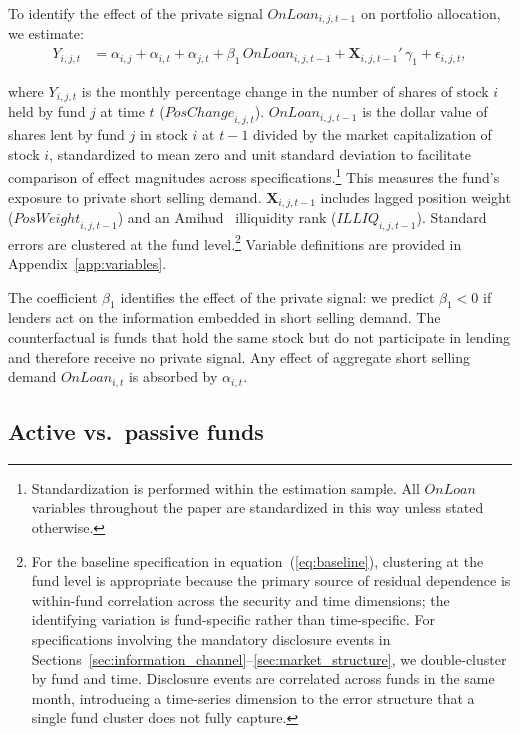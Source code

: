 To identify the effect of the private signal $OnLoan_{i,j,t-1}$ on portfolio allocation, we estimate:
\begin{align} \label{eq:baseline}
Y_{i,j,t} & = \alpha_{i,j} + \alpha_{i,t} + \alpha_{j,t} + \beta_{1}\, \mathit{OnLoan}_{i,j,t-1} + \mathbf{X}_{i,j,t-1}'\,\gamma_1 + \epsilon_{i,j,t},
\end{align}

\noindent where $Y_{i,j,t}$ is the monthly percentage change in the number of shares of stock $i$ held by fund $j$ at time $t$ ($\mathit{PosChange}_{i,j,t}$). $\mathit{OnLoan}_{i,j,t-1}$ is the dollar value of shares lent by fund $j$ in stock $i$ at $t-1$ divided by the market capitalization of stock $i$, standardized to mean zero and unit standard deviation to facilitate comparison of effect magnitudes across specifications.\footnote{Standardization is performed within the estimation sample. All $\mathit{OnLoan}$ variables throughout the paper are standardized in this way unless stated otherwise.} This measures the fund's exposure to private short selling demand. $\mathbf{X}_{i,j,t-1}$ includes lagged position weight ($\mathit{PosWeight}_{i,j,t-1}$) and an Amihud~\citeyearpar{amihud:02} illiquidity rank ($\mathit{ILLIQ}_{i,j,t-1}$). Standard errors are clustered at the fund level.\footnote{For the baseline specification in equation~(\ref{eq:baseline}), clustering at the fund level is appropriate because the primary source of residual dependence is within-fund correlation across the security and time dimensions; the identifying variation is fund-specific rather than time-specific. For specifications involving the mandatory disclosure events in Sections~\ref{sec:information_channel}--\ref{sec:market_structure}, we double-cluster by fund and time. Disclosure events are correlated across funds in the same month, introducing a time-series dimension to the error structure that a single fund cluster does not fully capture.} Variable definitions are provided in Appendix~\ref{app:variables}.

The coefficient $\beta_1$ identifies the effect of the private signal: we predict $\beta_1 < 0$ if lenders act on the information embedded in short selling demand. The counterfactual is funds that hold the same stock but do not participate in lending and therefore receive no private signal. Any effect of aggregate short selling demand $OnLoan_{i,t}$ is absorbed by $\alpha_{i,t}$.

\subsection{Active vs.\ passive funds} \label{subsec:active-passive}

